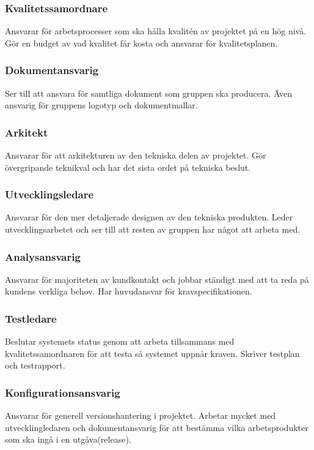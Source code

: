 \subsubsection*{Kvalitetssamordnare}
Ansvarar för arbetsprocesser som ska hålla kvalitén av projektet på en hög nivå. Gör en budget av vad kvalitet får kosta och ansvarar för kvalitetsplanen.

\subsubsection*{Dokumentansvarig}
Ser till att ansvara för samtliga dokument som gruppen ska producera. Även ansvarig för gruppens logotyp och dokumentmallar.

\subsubsection*{Arkitekt}
Ansvarar för att arkitekturen av den tekniska delen av projektet. Gör övergripande teknikval och har det sista ordet på tekniska beslut.

\subsubsection*{Utvecklingsledare}
Ansvarar för den mer detaljerade designen av den tekniska produkten. Leder utvecklingsarbetet och ser till att resten av gruppen har något att arbeta med.

\subsubsection*{Analysansvarig}
Ansvarar för majoriteten av kundkontakt och jobbar ständigt med att ta reda på kundens verkliga behov. Har huvudansvar för kravspecifikationen.

\subsubsection*{Testledare}
Beslutar systemets status genom att arbeta tillsammans med kvalitetssamordnaren för att testa så systemet uppnår kraven. Skriver testplan och testrapport.

\subsubsection*{Konfigurationsansvarig}
Ansvarar för generell versionshantering i projektet. Arbetar mycket med utvecklingledaren och dokumentansvarig för att bestämma vilka arbetsprodukter som ska ingå i en utgåva(release).


